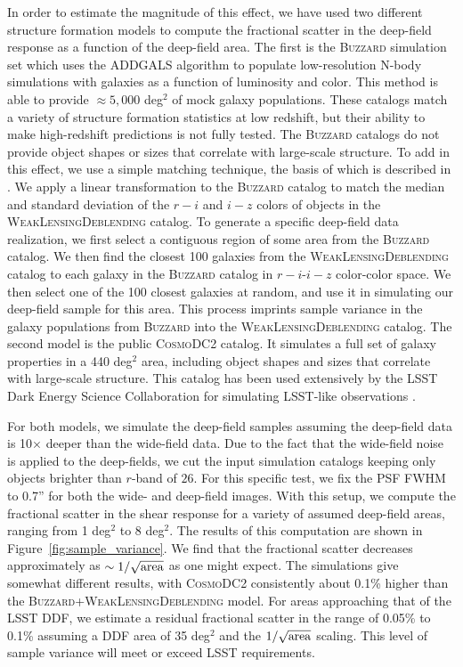 \documentclass[twocolumn]{openjournal}
\makeatletter
\newcommand{\descwl}{\textsc{WeakLensingDeblending}\@\xspace}
\newcommand{\cosmodctwo}{\textsc{CosmoDC2}\@\xspace}
\newcommand{\buzzard}{\textsc{Buzzard}\@\xspace}
\makeatother
\begin{document}
In order to estimate the magnitude of this effect, we have used two different structure
formation models to compute the fractional scatter in the deep-field response as a
function of the deep-field area. The first is the \buzzard simulation set
\citep{derose2019buzzard} which uses the \textsc{ADDGALS} \citep{addgals} algorithm to
populate low-resolution N-body simulations with galaxies as a function of luminosity
and color. This method is able to provide $\approx5,000$ deg$^2$ of mock galaxy
populations. These catalogs match a variety of structure formation statistics at low
redshift, but their ability to make high-redshift predictions is not fully tested. The
\buzzard catalogs do not provide object shapes or sizes that correlate with large-scale
structure. To add in this effect, we use a simple matching technique, the basis of which
is described in \citet{galsampler}. We apply a linear transformation to the \buzzard
catalog to match the median and standard deviation of the $r-i$ and $i-z$ colors  of
objects in the \descwl catalog. To generate a specific deep-field data realization, we
first select a contiguous region of some area from the \buzzard catalog. We then find
the closest 100 galaxies from the \descwl catalog to each galaxy in the \buzzard catalog
in $r-i$-$i-z$ color-color space. We then select one of the 100 closest galaxies at
random, and use it in simulating our deep-field sample for this area. This process
imprints sample variance in the galaxy populations from \buzzard into the \descwl
catalog. The second model is the public \cosmodctwo \citep{cosmodc2} catalog. It
simulates a full set of galaxy properties in a 440 deg$^2$ area, including object shapes
and sizes that correlate with large-scale structure. This catalog has been used
extensively by the LSST Dark Energy Science Collaboration for simulating LSST-like
observations \citep{dc2,dc2note}.

For both models, we simulate the deep-field samples assuming the deep-field data is
10$\times$ deeper than the wide-field data. Due to the fact that the wide-field noise is
applied to the deep-fields, we cut the input simulation catalogs keeping only objects
brighter than $r$-band of $26$. For this specific test, we fix the PSF FWHM to 0.7'' for
both the wide- and deep-field images. With this setup, we compute the fractional scatter
in the shear response for a variety of assumed deep-field areas, ranging from 1 deg$^2$
to 8 deg$^2$. The results of this computation are shown in
Figure~\ref{fig:sample_variance}. We find that the fractional scatter decreases
approximately as $\sim1/\sqrt{\rm area}$ as one might expect. The simulations give
somewhat different results, with \cosmodctwo consistently about 0.1\% higher than the
\buzzard+\descwl model. For areas approaching that of the LSST DDF, we estimate a
residual fractional scatter in the range of 0.05\% to 0.1\% assuming a DDF area of 35
deg$^2$ and the $1/\sqrt{\rm area}$ scaling. This level of sample variance will meet or
exceed LSST requirements.
\end{document}
